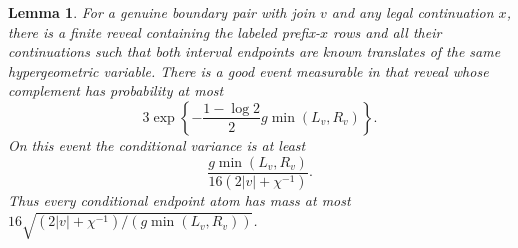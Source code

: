 \documentclass[11pt]{article}
\numberwithin{equation}{section}
\newtheorem{lemma}[theorem]{Lemma}
\theoremstyle{definition}
\theoremstyle{remark}
\newcommand{\1}{\mathbf 1}
\begin{document}
\begin{lemma}%
\label{lem:upper-smoothing}
For a genuine boundary pair with join $v$ and any legal continuation
$x$, there is a finite reveal containing the labeled prefix-$x$ rows
and all their continuations such that both interval endpoints are
known translates of the same hypergeometric variable. There is a
good event measurable in that reveal whose complement has probability
at most
\[
 3\exp\left\{-\frac{1-\log2}{2}g\min(L_v,R_v)\right\}.
\]
On this event the conditional variance is at least
\[
 \frac{g\min(L_v,R_v)}{16(2|v|+\chi^{-1})}.
\]
Thus every conditional endpoint atom has mass at most
$16\sqrt{(2|v|+\chi^{-1})/(g\min(L_v,R_v))}$.
\end{lemma}
\end{document}
